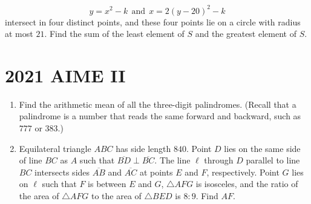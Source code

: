 \documentclass{article}
\begin{document}
\begin{enumerate}[label=\arabic*., itemsep=0.5em]
\begin{equation*}
y=x^2-k~~\text{and}~~x=2(y-20)^2-k
\end{equation*}
intersect in four distinct points, and these four points lie on a circle with radius at most $21$. Find the sum of the least element of $S$ and the greatest element of $S$.\par \vspace{0.5em}\end{enumerate}\newpage\section*{2021 AIME II}\begin{enumerate}[label=\arabic*., itemsep=0.5em]\item Find the arithmetic mean of all the three-digit palindromes. (Recall that a palindrome is a number that reads the same forward and backward, such as $777$ or $383$.)\par \vspace{0.5em}\item Equilateral triangle $ABC$ has side length $840$. Point $D$ lies on the same side of line $BC$ as $A$ such that $\overline{BD} \perp \overline{BC}$. The line $\ell$ through $D$ parallel to line $BC$ intersects sides $\overline{AB}$ and $\overline{AC}$ at points $E$ and $F$, respectively. Point $G$ lies on $\ell$ such that $F$ is between $E$ and $G$, $\triangle AFG$ is isosceles, and the ratio of the area of $\triangle AFG$ to the area of $\triangle BED$ is $8:9$. Find $AF$.


\end{enumerate}
\end{document}
